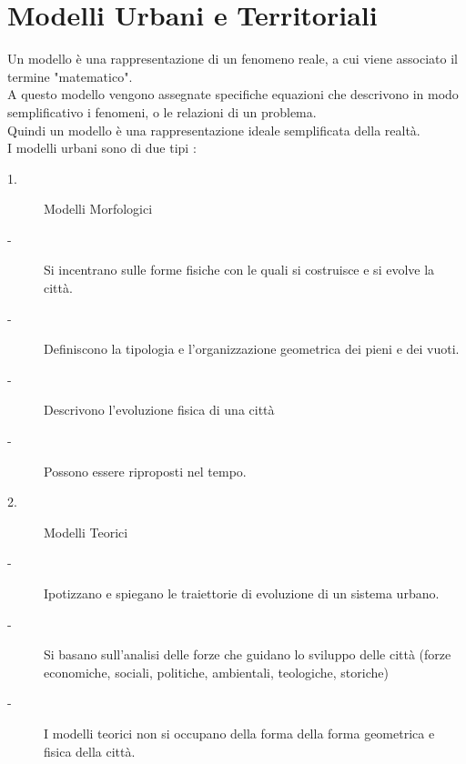 \documentclass[a4paper,12pt, oneside]{book}
\begin{document}
  \chapter{Modelli Urbani e Territoriali}
  Un modello è una rappresentazione di un fenomeno reale, a cui viene associato il termine "matematico".\\
  A questo modello vengono assegnate specifiche equazioni che descrivono in modo semplificativo i fenomeni, o le relazioni di un problema.\\
  Quindi un modello è una rappresentazione ideale semplificata della realtà.\\
  I modelli urbani sono di due tipi : \\
    \begin{multicols}{2}
  	  \begin{description}
  		\item [1.] Modelli Morfologici
  		\item [  -] Si incentrano sulle forme fisiche con le quali si costruisce e si evolve la città. 
  		\item [  -] Definiscono la tipologia e l'organizzazione geometrica dei pieni e dei vuoti.
  		\item [  -] Descrivono l'evoluzione fisica di una città
  		\item [  -] Possono essere riproposti nel tempo.
  		\item [2.] Modelli Teorici
  		\item [   -] Ipotizzano e spiegano le traiettorie di evoluzione di un sistema urbano. 
  		\item [   -] Si basano sull'analisi delle forze che guidano lo sviluppo delle città (forze economiche, sociali, politiche, ambientali, teologiche, storiche)
  		\item [   -] I modelli teorici non si occupano della forma della forma geometrica e fisica della città.
  	  \end{description}
    \end{multicols}
  \leavevmode\\
\end{document}

